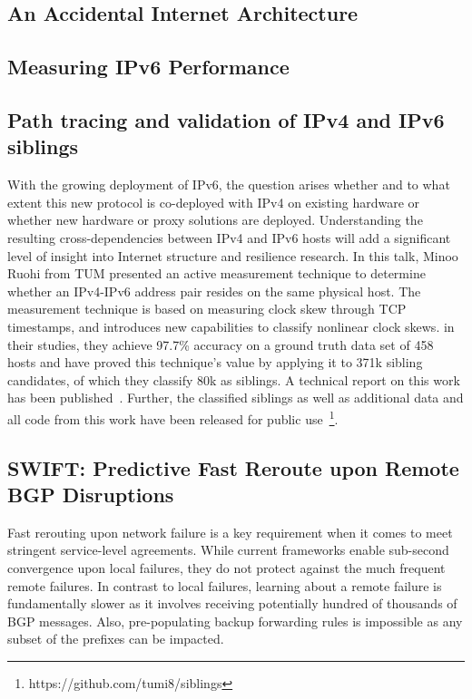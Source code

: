 \subsection{An Accidental Internet Architecture}


\subsection{Measuring IPv6 Performance}


\subsection{Path tracing and validation of IPv4 and IPv6 siblings}

With the growing deployment of IPv6, the question arises whether and to what
extent this new protocol is co-deployed with IPv4 on existing hardware or
whether new hardware or proxy solutions are deployed. Understanding the
resulting cross-dependencies between IPv4 and IPv6 hosts will add a
significant level of insight into Internet structure and resilience research.
In this talk, Minoo Ruohi from TUM presented an active measurement technique
to determine whether an IPv4-IPv6 address pair resides on the same physical
host. The measurement technique is based on measuring clock skew through TCP
timestamps, and introduces new capabilities to classify nonlinear clock skews.
in their studies, they achieve 97.7\% accuracy on a ground truth data set of
458 hosts and have proved this technique's value by applying it to 371k
sibling candidates, of which they classify 80k as siblings. A technical report
on this work has been published~\cite{Scheitle2016}. Further, the classified
siblings as well as additional data and all code from this work have been
released for public use~\footnote{https://github.com/tumi8/siblings}.


\subsection{SWIFT: Predictive Fast Reroute upon Remote BGP Disruptions}

Fast rerouting upon network failure is a key requirement when it comes to meet
stringent service-level agreements. While current frameworks enable sub-second
convergence upon local failures, they do not protect against the much frequent
remote failures. In contrast to local failures, learning about a remote
failure is fundamentally slower as it involves receiving potentially hundred
of thousands of BGP messages. Also, pre-populating backup forwarding rules is
impossible as any subset of the prefixes can be impacted.

